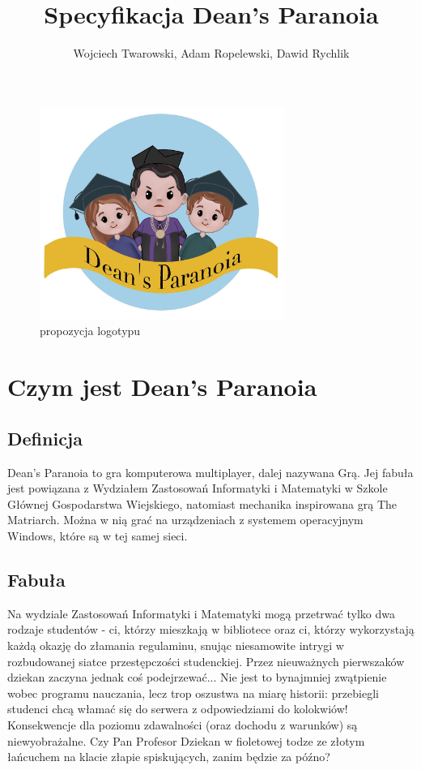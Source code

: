 \documentclass[]{report}
\title{Specyfikacja Dean's Paranoia}
\author{Wojciech Twarowski, Adam Ropelewski, Dawid Rychlik}
\begin{document}
\maketitle
\tableofcontents
\newpage

\begin{figure}[H]
	\centering
	\includegraphics[width=8cm]{Figures/paranoia.jpg}
	\caption{propozycja logotypu}
\end{figure}

\section{Czym jest Dean's Paranoia}

\subsection{Definicja}
Dean's Paranoia to gra komputerowa multiplayer, dalej nazywana Grą. Jej fabuła jest powiązana z Wydziałem Zastosowań Informatyki i Matematyki w Szkole Głównej Gospodarstwa Wiejskiego, natomiast mechanika inspirowana grą The Matriarch. Można w nią grać na urządzeniach z systemem operacyjnym Windows, które są w tej samej sieci.

\subsection{Fabuła}
Na wydziale Zastosowań Informatyki i Matematyki mogą przetrwać tylko dwa rodzaje studentów - ci, którzy mieszkają w bibliotece oraz ci, którzy wykorzystają każdą okazję do złamania regulaminu, snując niesamowite intrygi w rozbudowanej siatce przestępczości studenckiej. Przez nieuważnych pierwszaków dziekan zaczyna jednak coś podejrzewać... Nie jest to bynajmniej zwątpienie wobec programu nauczania, lecz trop oszustwa na miarę historii: przebiegli studenci chcą włamać się do serwera z odpowiedziami do kolokwiów! Konsekwencje dla poziomu zdawalności (oraz dochodu z warunków) są niewyobrażalne. Czy Pan Profesor Dziekan w fioletowej todze ze złotym łańcuchem na klacie złapie spiskujących, zanim będzie za późno?
\end{document}
